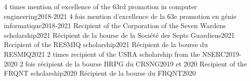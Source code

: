     \resumeSubHeadingListStart
        \resumeDatedItemEnFr
            {4 times mention of excellence of the 63rd promotion in computer engineering}{2018-2021}
            {4 fois mention d’excellence de la 63e promotion en génie informatique}{2018-2021}
        \resumeDatedItemEnFr
            {Recipient of the Corporation of the Seven Wardens scholarship}{2021}
            {Récipient de la bourse de la Société des Septs Guardiens}{2021}
        \resumeDatedItemEnFr
            {Recipient of the RESMIQ scholarship}{2021}
            {Récipient de la bourse du RESMIQ}{2021}
        \resumeDatedItemEnFr
            {2 times recipient of the USRA scholarship from the NSERC}{2019-2020}
            {2 fois récipient de la bourse BRPG du CRSNG}{2019 et 2020}
        \resumeDatedItemEnFr
            {Recipient of the FRQNT scholarship}{2020}
            {Récipient de la bourse du FRQNT}{2020}
    \resumeSubHeadingListEnd